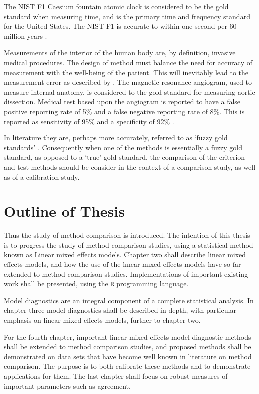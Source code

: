 \documentclass[12pt, a4paper]{report}
\theoremstyle{plain}
\theoremstyle{definition}
\theoremstyle{remark}
\begin{document}
The NIST F1 Caesium fountain atomic clock is considered to be the
gold standard when measuring time, and is the primary time and
frequency standard for the United States. The NIST F1 is accurate
to within one second per 60 million years \citep{NIST}.

Measurements of the interior of the human body are, by definition,
invasive medical procedures. The design of method must balance the
need for accuracy of measurement with the well-being of the
patient. This will inevitably lead to the measurement error as
described by \citet{DunnSEME}. The magnetic resonance angiogram,
used to measure internal anatomy,  is considered to the gold
standard for measuring aortic dissection. Medical test based upon
the angiogram is reported to have a false positive reporting rate
of 5\% and a false negative reporting rate of 8\%. This is
reported as sensitivity of 95\% and a specificity of 92\%
\citep{ACR}.

In literature they are, perhaps more accurately, referred to as
`fuzzy gold standards' \citep{phelps}. Consequently when one of the methods is
essentially a fuzzy gold standard, as opposed to a `true' gold
standard, the comparison of the criterion and test methods should
be consider in the context of a comparison study, as well as of a
calibration study.

\newpage
\section{Outline of Thesis}
Thus the study of method comparison is introduced. The intention of this thesis is to progress the
study of method comparison studies, using a statistical method known as Linear mixed effects models.
Chapter two shall describe linear mixed effects models, and how the use of the linear mixed
effects models have so far extended to method comparison studies. Implementations of important existing work shall be presented, using the \texttt{R} programming language.

Model diagnostics are an integral component of a complete statistical analysis.
In chapter three model diagnostics shall be described in depth, with particular
emphasis on linear mixed effects models, further to chapter two.

For the fourth chapter, important linear mixed effects model diagnostic methods shall be extended to method comparison studies, and proposed methods shall be demonstrated on data sets that have become well known in literature on method comparison. The purpose is to both calibrate these methods and to demonstrate applications for them.
The last chapter shall focus on robust measures of important parameters such as agreement.
\end{document}
